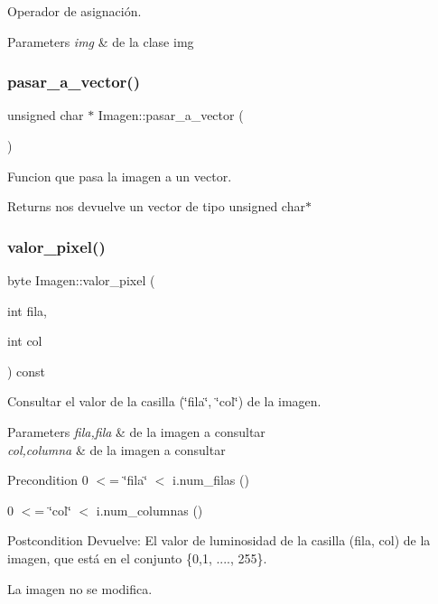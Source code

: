 Operador de asignación. 


\begin{DoxyParams}{Parameters}
{\em img} & de la clase img \\
\hline
\end{DoxyParams}
\mbox{\label{classImagen_a4ff2179227e9de5b8b735b5d43d3f2b4}} 
\subsubsection{\texorpdfstring{pasar\+\_\+a\+\_\+vector()}{pasar\_a\_vector()}}
{\footnotesize\ttfamily unsigned char $\ast$ Imagen\+::pasar\+\_\+a\+\_\+vector (\begin{DoxyParamCaption}{ }\end{DoxyParamCaption})}



Funcion que pasa la imagen a un vector. 

\begin{DoxyReturn}{Returns}
nos devuelve un vector de tipo unsigned char$\ast$ 
\end{DoxyReturn}
\mbox{\label{classImagen_a7d9378695a7fd2dce8092f180e716229}} 
\subsubsection{\texorpdfstring{valor\+\_\+pixel()}{valor\_pixel()}}
{\footnotesize\ttfamily byte Imagen\+::valor\+\_\+pixel (\begin{DoxyParamCaption}\item[{int}]{fila,  }\item[{int}]{col }\end{DoxyParamCaption}) const\hspace{0.3cm}{\ttfamily [inline]}}



Consultar el valor de la casilla (\char`\"{}fila\char`\"{}, \char`\"{}col\char`\"{}) de la imagen. 


\begin{DoxyParams}{Parameters}
{\em fila,fila} & de la imagen a consultar \\
\hline
{\em col,columna} & de la imagen a consultar \\
\hline
\end{DoxyParams}
\begin{DoxyPrecond}{Precondition}
0 $<$= \char`\"{}fila\char`\"{} $<$ i.\+num\+\_\+filas () 

0 $<$= \char`\"{}col\char`\"{} $<$ i.\+num\+\_\+columnas () 
\end{DoxyPrecond}
\begin{DoxyPostcond}{Postcondition}
Devuelve\+: El valor de luminosidad de la casilla (fila, col) de la imagen, que está en el conjunto \{0,1, ...., 255\}. 

La imagen no se modifica. 
\end{DoxyPostcond}


